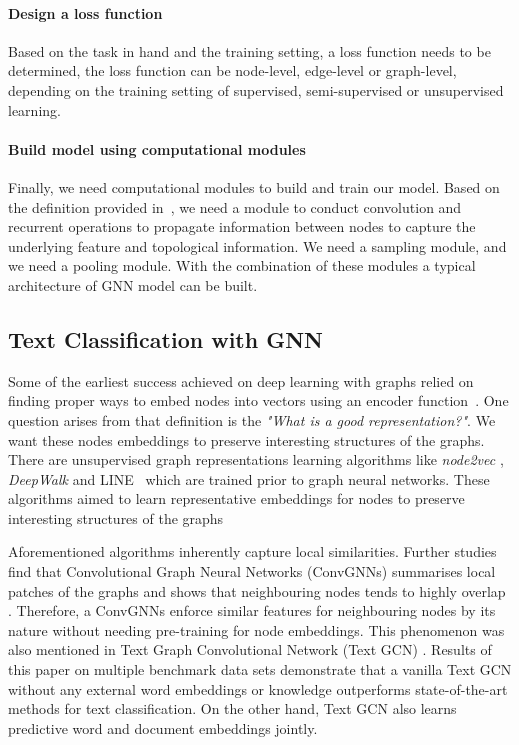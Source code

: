 \paragraph{Design a loss function}
Based on the task in hand and the training setting, a loss function needs to be determined, the loss function can be node-level, edge-level or graph-level, depending on the training setting of supervised, semi-supervised or unsupervised learning.

\paragraph{Build model using computational modules}
Finally, we need computational modules to build and train our model. Based on the definition provided in~\autocite{zhou20gnn}, we need a module to conduct convolution and recurrent operations to propagate information between nodes to capture the underlying feature and topological information. We need a sampling module, and we need a pooling module. With the combination of these modules a typical architecture of GNN model can be built.

\subsection{Text Classification with GNN}\label{sec:related:tc_with_gnn} 
Some of the earliest success achieved on deep learning with graphs relied on finding proper ways to embed nodes into vectors using an encoder function~\autocite{velickovic21gnn}. One question arises from that definition is the \emph{"What is a good representation?"}. We want these nodes embeddings to preserve interesting structures of the graphs. There are unsupervised graph representations learning algorithms like \emph{node2vec} \autocite{node2vec}, \emph{DeepWalk} \autocite{deepwalk2014} and LINE~\autocite{line2015} which are trained prior to graph neural networks. These algorithms aimed to learn representative embeddings for nodes to preserve interesting structures of the graphs 

Aforementioned algorithms inherently capture local similarities. Further studies find that Convolutional Graph Neural Networks (ConvGNNs) summarises local patches of the graphs and shows that neighbouring nodes tends to highly overlap \autocite{velickovic21gnn}. Therefore, a ConvGNNs enforce similar features for neighbouring nodes by its nature without needing pre-training for node embeddings. This phenomenon was also mentioned in Text Graph Convolutional Network (Text GCN) \autocite{yao18graph}. Results of this paper on multiple benchmark data sets demonstrate that a vanilla Text GCN without any external word embeddings or knowledge outperforms state-of-the-art methods for text classification. On the other hand, Text GCN also learns predictive word and document embeddings jointly. 

